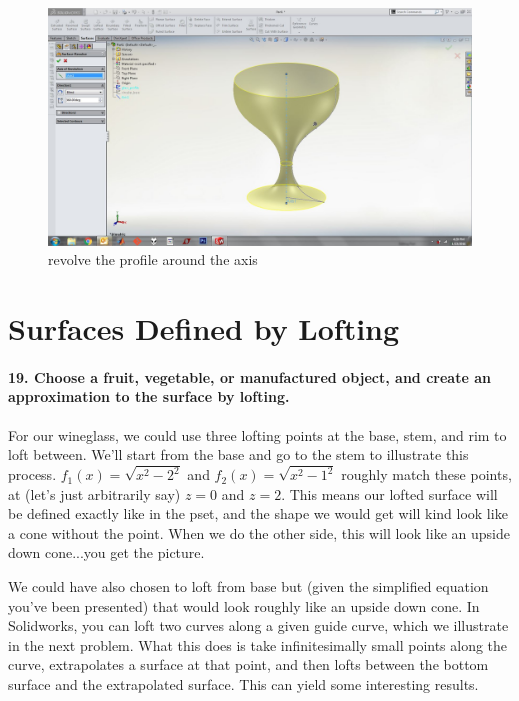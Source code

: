 \documentclass{article}
\begin{document}
\begin{figure}[h!]
    \centering
    \includegraphics[width=1\textwidth]{figs_and_code/QEA_revolve}
    \caption{revolve the profile around the axis}
\end{figure}


\section{Surfaces Defined by Lofting}

\paragraph{19. Choose a fruit, vegetable, or manufactured object, and create an approximation to the surface by lofting.}

For our wineglass, we could use three lofting points at the base, stem, and rim to loft between. We'll start from the base and go to the stem to illustrate this process. $f_1(x) = \sqrt{x^2 - 2^2}$ and $f_2(x) = \sqrt{x^2 - 1^2}$ roughly match these points, at (let's just arbitrarily say) $z = 0$ and $z = 2$. This means our lofted surface will be defined exactly like in the pset, and the shape we would get will kind look like a cone without the point. When we do the other side, this will look like an upside down cone...you get the picture. 

We could have also chosen to loft from base but (given the simplified equation you've been presented) that would look roughly like an upside down cone. In Solidworks, you can loft two curves along a given guide curve, which we illustrate in the next problem. What this does is take infinitesimally small points along the curve, extrapolates a surface at that point, and then lofts between the bottom surface and the extrapolated surface. This can yield some interesting results.
\end{document}
